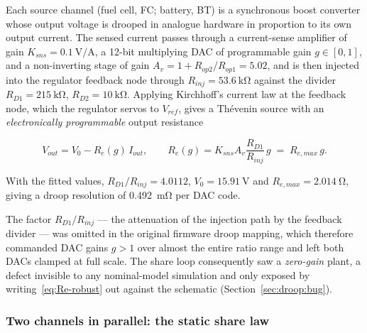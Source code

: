 Each source channel (fuel cell, FC; battery, BT) is a synchronous boost converter whose
output voltage is drooped in analogue hardware in proportion to its own output current.
The sensed current passes through a current-sense amplifier of gain
$K_{sns}=\SI{0.1}{\volt\per\ampere}$, %
a 12-bit multiplying DAC of programmable gain $g\in[0,1]$, and a non-inverting stage of
gain $A_v = 1 + R_{op2}/R_{op1} = \num{5.02}$, %
and is then injected into the regulator feedback node through $R_{inj}=\SI{53.6}{\kilo\ohm}$
against the divider $R_{D1}=\SI{215}{\kilo\ohm}$, $R_{D2}=\SI{10}{\kilo\ohm}$.
Applying Kirchhoff's current law at the feedback node, which the regulator servos to
$V_{ref}$, gives a Th\'evenin source with an \emph{electronically programmable} output
resistance

\begin{equation}
V_{out} = V_0 - R_e(g)\,I_{out},
\qquad
R_e(g) = K_{sns}A_v\frac{R_{D1}}{R_{inj}}\,g \;=\; R_{e,max}\,g .
\label{eq:Re-robust}
\end{equation}

With the fitted values, $R_{D1}/R_{inj}=\num{4.0112}$, $V_0 = \SI{15.91}{\volt}$ and
$R_{e,max} = \SI{2.014}{\ohm}$, %
giving a droop resolution of \SI{0.492}{\milli\ohm} per DAC code.

The factor $R_{D1}/R_{inj}$ --- the attenuation of the injection path by the feedback
divider --- was omitted in the original firmware droop mapping, which therefore commanded
DAC gains $g>1$ over almost the entire ratio range and left both DACs clamped at full
scale. The share loop consequently saw a \emph{zero-gain} plant, a defect invisible to
any nominal-model simulation and only exposed by writing~\eqref{eq:Re-robust} out against
the schematic (Section~\ref{sec:droop:bug}).

\subsubsection{Two channels in parallel: the static share law}

